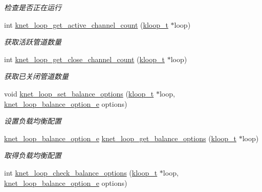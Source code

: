 \begin{DoxyCompactItemize}
\begin{DoxyCompactList}\small\item\em 检查是否正在运行 \end{DoxyCompactList}\item 
int \hyperlink{a00108_ga1eca6d310350a4545182666db28fb91f_ga1eca6d310350a4545182666db28fb91f}{knet\+\_\+loop\+\_\+get\+\_\+active\+\_\+channel\+\_\+count} (\hyperlink{a00053_a97fc76209a58362019f1ded9169e397f_a97fc76209a58362019f1ded9169e397f}{kloop\+\_\+t} $\ast$loop)
\begin{DoxyCompactList}\small\item\em 获取活跃管道数量 \end{DoxyCompactList}\item 
int \hyperlink{a00108_ga8a8c7aee4eed09d50062a5f464cdba7a_ga8a8c7aee4eed09d50062a5f464cdba7a}{knet\+\_\+loop\+\_\+get\+\_\+close\+\_\+channel\+\_\+count} (\hyperlink{a00053_a97fc76209a58362019f1ded9169e397f_a97fc76209a58362019f1ded9169e397f}{kloop\+\_\+t} $\ast$loop)
\begin{DoxyCompactList}\small\item\em 获取已关闭管道数量 \end{DoxyCompactList}\item 
void \hyperlink{a00071_a1f1c1aa48792e069f46d4586da064e30_a1f1c1aa48792e069f46d4586da064e30}{knet\+\_\+loop\+\_\+set\+\_\+balance\+\_\+options} (\hyperlink{a00053_a97fc76209a58362019f1ded9169e397f_a97fc76209a58362019f1ded9169e397f}{kloop\+\_\+t} $\ast$loop, \hyperlink{a00053_aa131da8fb72468b39b6ee0e2d46b17b2_aa131da8fb72468b39b6ee0e2d46b17b2}{knet\+\_\+loop\+\_\+balance\+\_\+option\+\_\+e} options)
\begin{DoxyCompactList}\small\item\em 设置负载均衡配置 \end{DoxyCompactList}\item 
\hyperlink{a00053_aa131da8fb72468b39b6ee0e2d46b17b2_aa131da8fb72468b39b6ee0e2d46b17b2}{knet\+\_\+loop\+\_\+balance\+\_\+option\+\_\+e} \hyperlink{a00071_a127c7897dd1ea9db069c7855bbebb557_a127c7897dd1ea9db069c7855bbebb557}{knet\+\_\+loop\+\_\+get\+\_\+balance\+\_\+options} (\hyperlink{a00053_a97fc76209a58362019f1ded9169e397f_a97fc76209a58362019f1ded9169e397f}{kloop\+\_\+t} $\ast$loop)
\begin{DoxyCompactList}\small\item\em 取得负载均衡配置 \end{DoxyCompactList}\item 
int \hyperlink{a00071_a6bb7816f43410b76b5b0c6d0f6edfbd8_a6bb7816f43410b76b5b0c6d0f6edfbd8}{knet\+\_\+loop\+\_\+check\+\_\+balance\+\_\+options} (\hyperlink{a00053_a97fc76209a58362019f1ded9169e397f_a97fc76209a58362019f1ded9169e397f}{kloop\+\_\+t} $\ast$loop, \hyperlink{a00053_aa131da8fb72468b39b6ee0e2d46b17b2_aa131da8fb72468b39b6ee0e2d46b17b2}{knet\+\_\+loop\+\_\+balance\+\_\+option\+\_\+e} options)

\end{DoxyCompactItemize}
